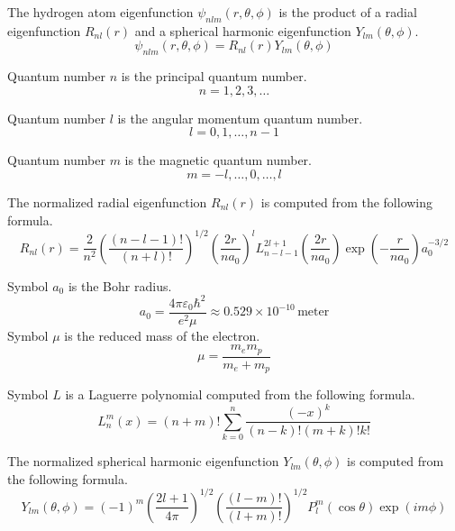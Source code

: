 \documentclass[12pt]{article}
\begin{document}
\noindent
The hydrogen atom eigenfunction $\psi_{nlm}(r,\theta,\phi)$
is the product of a radial eigenfunction $R_{nl}(r)$ and a spherical
harmonic eigenfunction $Y_{lm}(\theta,\phi)$.
\begin{equation*}
\psi_{nlm}(r,\theta,\phi)=R_{nl}(r)Y_{lm}(\theta,\phi)
\end{equation*}

\noindent
Quantum number $n$ is the principal quantum number.
\begin{equation*}
n=1,2,3,\ldots
\end{equation*}

\noindent
Quantum number $l$ is the angular momentum quantum number.
\begin{equation*}
l=0,1,\ldots,n-1
\end{equation*}

\noindent
Quantum number $m$ is the magnetic quantum number.
\begin{equation*}
m=-l,\ldots,0,\ldots,l
\end{equation*}

\noindent
The normalized radial eigenfunction $R_{nl}(r)$ is computed from the following formula.
\begin{equation*}
R_{nl}(r)=
\frac{2}{n^2}
\left(\frac{(n-l-1)!}{(n+l)!}\right)^{1/2}
\left(\frac{2r}{na_0}\right)^l
L_{n-l-1}^{2l+1}\left(\frac{2r}{na_0}\right)
\exp\left(-\frac{r}{na_0}\right)
a_0^{-3/2}
\end{equation*}

\noindent
Symbol $a_0$ is the Bohr radius.
\begin{equation*}
a_0=\frac{4\pi\varepsilon_0\hbar^2}{e^2\mu}
\approx0.529\times10^{-10}\,\text{meter}
\end{equation*}
Symbol $\mu$ is the reduced mass of the electron.
\begin{equation*}
\mu=\frac{m_e m_p}{m_e+m_p}
\end{equation*}

\noindent
Symbol $L$ is a Laguerre polynomial computed from the following formula.
\begin{equation*}
L_n^m(x)=(n+m)!\sum_{k=0}^n
\frac{(-x)^k}{(n-k)!(m+k)!k!}
\end{equation*}

\noindent
The normalized spherical harmonic eigenfunction $Y_{lm}(\theta,\phi)$
is computed from the following formula.
\begin{equation*}
Y_{lm}(\theta,\phi)=(-1)^m
\left(\frac{2l+1}{4\pi}\right)^{1/2}
\left(\frac{(l-m)!}{(l+m)!}\right)^{1/2}
P_l^m(\cos\theta)\exp(im\phi)
\end{equation*}
\end{document}
